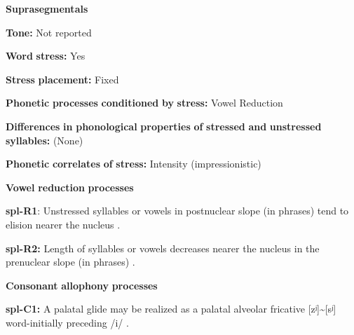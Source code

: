 \begin{styleBody}
\textbf{Suprasegmentals}
\end{styleBody}

\begin{styleBody}
\textbf{Tone:} Not reported
\end{styleBody}

\begin{styleBody}
\textbf{Word} \textbf{stress:} Yes
\end{styleBody}

\begin{styleBody}
\textbf{Stress} \textbf{placement:} Fixed
\end{styleBody}

\begin{styleBody}
\textbf{Phonetic} \textbf{processes} \textbf{conditioned} \textbf{by} \textbf{stress:} Vowel Reduction
\end{styleBody}

\begin{styleBody}
\textbf{Differences} \textbf{in} \textbf{phonological} \textbf{properties} \textbf{of} \textbf{stressed} \textbf{and} \textbf{unstressed} \textbf{syllables:} (None)
\end{styleBody}

\begin{styleBody}
\textbf{Phonetic} \textbf{correlates} \textbf{of} \textbf{stress:} Intensity (impressionistic)
\end{styleBody}

\begin{styleBody}
\textbf{Vowel} \textbf{reduction} \textbf{processes}
\end{styleBody}

\begin{styleBody}
\textbf{spl-R1}: Unstressed syllables or vowels in postnuclear slope (in phrases) tend to elision nearer the nucleus \citep[6]{McElhanon1970}.
\end{styleBody}

\begin{styleBody}
\textbf{spl-R2:} Length of syllables or vowels decreases nearer the nucleus in the prenuclear slope (in phrases) \citep[6]{McElhanon1970}.
\end{styleBody}

\begin{styleBody}
\textbf{Consonant} \textbf{allophony} \textbf{processes}
\end{styleBody}

\begin{styleBody}
\textbf{spl-C1:} A palatal glide may be realized as a palatal alveolar fricative [zʲ]{\textasciitilde}[sʲ] word-initially preceding /i/ \citep{McElhanon1970}.
\end{styleBody}

